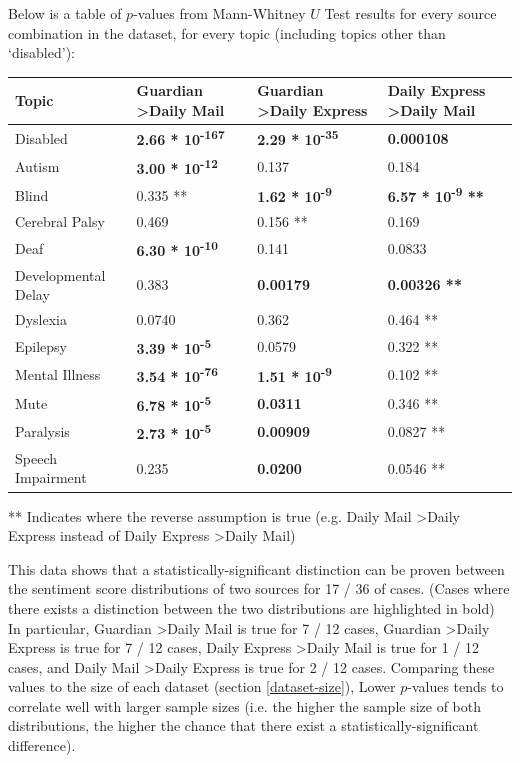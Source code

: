 \documentclass{report}
\begin{document}
Below is a table of $p$-values from Mann-Whitney $U$ Test results for every source combination in the dataset, for every topic (including topics other than `disabled'):

\noindent
\begin{tabu} to 1.0\textwidth { | X[c] | X[c] | X[c] | X[c] | }
	\hline
	Topic & Guardian \textgreater\space Daily Mail & Guardian \textgreater\space Daily Express & Daily Express \textgreater\space Daily Mail  \\
		\hline
	Disabled & \textbf{2.66 * 10\textsuperscript{-167}} & \textbf{2.29 * 10\textsuperscript{-35}} & \textbf{0.000108}  \\
	\hline
	Autism & \textbf{3.00 * 10\textsuperscript{-12}} & 0.137 & 0.184  \\
	\hline
	Blind & 0.335 ** & \textbf{1.62 * 10\textsuperscript{-9}} & \textbf{6.57 * 10\textsuperscript{-9} **} \\
	\hline
	Cerebral Palsy & 0.469 & 0.156 ** & 0.169  \\
	\hline
	Deaf & \textbf{6.30 * 10\textsuperscript{-10}} & 0.141 & 0.0833  \\
	\hline
	Developmental Delay & 0.383 & \textbf{0.00179} & \textbf{0.00326 **}  \\
	\hline
	Dyslexia & 0.0740 & 0.362 & 0.464 **  \\
	\hline
	Epilepsy & \textbf{3.39 * 10\textsuperscript{-5}} & 0.0579 & 0.322 **  \\
	\hline
	Mental Illness & \textbf{3.54 * 10\textsuperscript{-76}} & \textbf{1.51 * 10\textsuperscript{-9}} & 0.102 **  \\
	\hline
	Mute & \textbf{6.78 * 10\textsuperscript{-5}} & \textbf{0.0311} & 0.346 ** \\
	\hline
	Paralysis & \textbf{2.73 * 10\textsuperscript{-5}} & \textbf{0.00909} & 0.0827 **  \\
	\hline
	Speech Impairment & 0.235 & \textbf{0.0200} & 0.0546 **  \\
	\hline
\end{tabu}
** Indicates where the reverse assumption is true (e.g. Daily Mail \textgreater\space Daily Express instead of Daily Express \textgreater\space Daily Mail)

This data shows that a statistically-significant distinction can be proven between the sentiment score distributions of two sources for 17 / 36 of cases.
(Cases where there exists a distinction between the two distributions are highlighted in bold)
In particular, Guardian \textgreater\space Daily Mail is true for 7 / 12 cases, Guardian \textgreater\space Daily Express is true for 7 / 12 cases, Daily Express \textgreater\space Daily Mail is true for 1 / 12 cases, and Daily Mail \textgreater\space Daily Express is true for 2 / 12 cases.
Comparing these values to the size of each dataset (section \ref{dataset-size}), Lower $p$-values tends to correlate well with larger sample sizes (i.e. the higher the sample size of both distributions, the higher the chance that there exist a statistically-significant difference).
\end{document}
